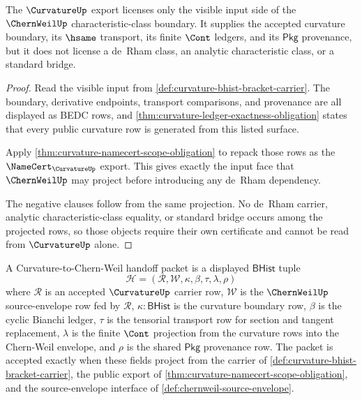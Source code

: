 \begin{theorem}
\label{thm:curvature-chernweil-visible-class-boundary}
The $\CurvatureUp$ export licenses only the visible input side of the $\ChernWeilUp$ characteristic-class boundary. It supplies the accepted curvature boundary, its $\hsame$ transport, its finite $\Cont$ ledgers, and its $\mathsf{Pkg}$ provenance, but it does not license a de~Rham class, an analytic characteristic class, or a standard bridge.
\end{theorem}
\begin{proof}
Read the visible input from \autoref{def:curvature-bhist-bracket-carrier}. The boundary, derivative endpoints, transport comparisons, and provenance are all displayed as BEDC rows, and \autoref{thm:curvature-ledger-exactness-obligation} states that every public curvature row is generated from this listed surface.

Apply \autoref{thm:curvature-namecert-scope-obligation} to repack those rows as the $\NameCert_{\CurvatureUp}$ export. This gives exactly the input face that $\ChernWeilUp$ may project before introducing any de~Rham dependency.

The negative clauses follow from the same projection. No de~Rham carrier, analytic characteristic-class equality, or standard bridge occurs among the projected rows, so those objects require their own certificate and cannot be read from $\CurvatureUp$ alone.
\end{proof}

\begin{definition}
\label{def:curvature-chernweil-handoff-packet}
A Curvature-to-Chern-Weil handoff packet is a displayed $\mathsf{BHist}$ tuple
$$
\mathcal{H}=(\mathcal{R},\mathcal{W},\kappa,\beta,\tau,\lambda,\rho)
$$
where $\mathcal{R}$ is an accepted $\CurvatureUp$ carrier row, $\mathcal{W}$ is the $\ChernWeilUp$ source-envelope row fed by $\mathcal{R}$, $\kappa:\mathsf{BHist}$ is the curvature boundary row, $\beta$ is the cyclic Bianchi ledger, $\tau$ is the tensorial transport row for section and tangent replacement, $\lambda$ is the finite $\Cont$ projection from the curvature rows into the Chern-Weil envelope, and $\rho$ is the shared $\mathsf{Pkg}$ provenance row. The packet is accepted exactly when these fields project from the carrier of \autoref{def:curvature-bhist-bracket-carrier}, the public export of \autoref{thm:curvature-namecert-scope-obligation}, and the source-envelope interface of \autoref{def:chernweil-source-envelope}.
\end{definition}

